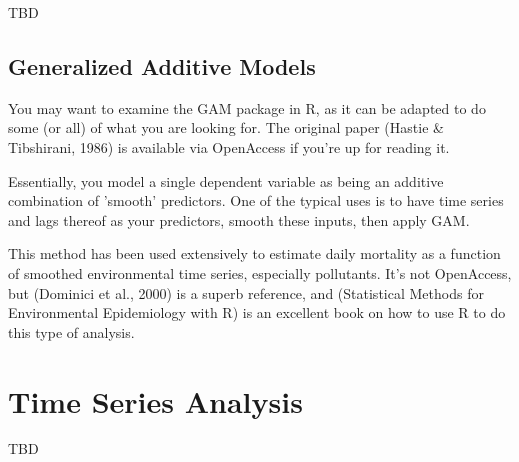 \documentclass{article}\usepackage[]{graphicx}\usepackage[]{color}
\begin{document}
TBD

\subsection{Generalized Additive Models}

You may want to examine the GAM package in R, as it can be adapted to do some (or all) of what you are looking for. The original paper (Hastie \& Tibshirani, 1986) is available via OpenAccess if you're up for reading it.

Essentially, you model a single dependent variable as being an additive combination of 'smooth' predictors. One of the typical uses is to have time series and lags thereof as your predictors, smooth these inputs, then apply GAM.

This method has been used extensively to estimate daily mortality as a function of smoothed environmental time series, especially pollutants. It's not OpenAccess, but (Dominici et al., 2000) is a superb reference, and (Statistical Methods for Environmental Epidemiology with R) is an excellent book on how to use R to do this type of analysis.

\section{Time Series Analysis}

TBD


\end{document}
